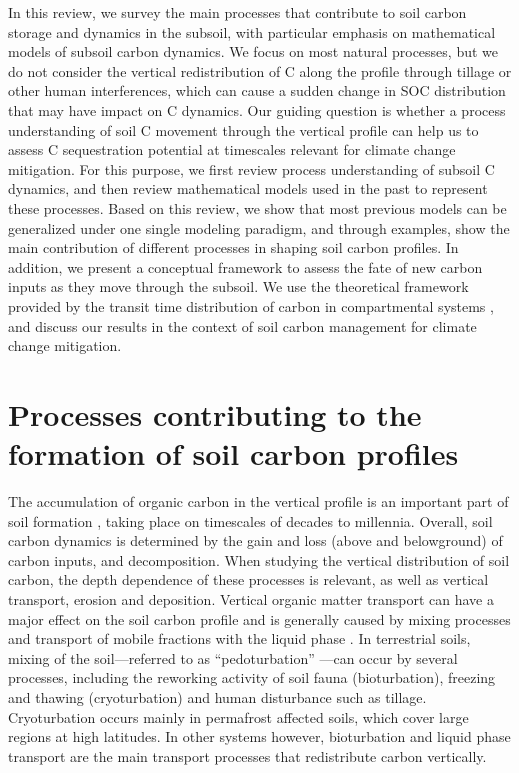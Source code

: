 \documentclass[11pt, oneside, a4paper]{article}   	%
\begin{document}
In this review, we survey the main processes that contribute to soil carbon storage and dynamics in the subsoil, with particular emphasis on mathematical models of subsoil carbon dynamics. 
We focus on most natural processes, but we do not consider the vertical redistribution of C along the profile through tillage or other human interferences, which can cause a sudden change in SOC distribution that may have impact on C dynamics.
Our guiding question is whether a process understanding of soil C movement through the vertical profile can help us to assess C sequestration potential at timescales relevant for climate change mitigation. 
For this purpose, we first review process understanding of subsoil C dynamics, and then review mathematical models used in the past to represent these processes. Based on this review, we show that most previous models can be generalized under one single modeling paradigm, and through examples, show the main contribution of different processes in shaping soil carbon profiles. 
In addition, we present a conceptual framework to assess the fate of new carbon inputs as they move through the subsoil. We use the theoretical framework provided by the transit time distribution of carbon in compartmental systems \citep{Sierra2017GCB, Sierra2018GBC, Metzler2018MG}, and discuss our results in the context of  soil carbon management for climate change mitigation.

\section{Processes contributing to the formation of soil carbon profiles}
The accumulation of organic carbon in the vertical profile is an important part of soil formation \citep{Jenny1980, vanBreemen1997}, taking place on timescales of
decades to millennia. Overall, soil carbon dynamics is determined by the gain and loss (above and belowground) of carbon inputs, and decomposition. When studying the
vertical distribution of soil carbon, the depth dependence of these processes is relevant, as
well as vertical transport, erosion and deposition.
Vertical organic matter transport can have a major effect on the soil carbon profile and is generally caused by mixing processes and transport of mobile fractions with the liquid
phase \citep{vanBreemen1997, Rumpel2011}. In terrestrial soils, mixing of the soil—referred to as “pedoturbation” \citep{Hole1961}—can
occur by several processes, including the reworking activity of soil fauna (bioturbation), freezing and thawing (cryoturbation) \citep{Johnson1987} and human disturbance such as tillage. Cryoturbation
occurs mainly in permafrost affected soils, which cover large regions at high latitudes. 
In other systems however, bioturbation and liquid phase transport are the main transport processes that redistribute carbon vertically. 
\end{document}
